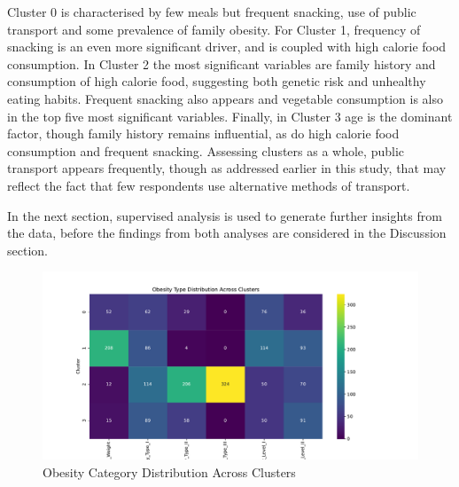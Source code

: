 Cluster 0 is characterised by few meals but frequent snacking, use of public transport and some prevalence of family obesity. For Cluster 1, frequency of snacking is an even more significant driver, and is coupled with high calorie food consumption. In Cluster 2 the most significant variables are family history and consumption of high calorie food, suggesting both genetic risk and unhealthy eating habits. Frequent snacking also appears and vegetable consumption is also in the top five most significant variables. Finally, in Cluster 3 age is the dominant factor, though family history remains influential, as do high calorie food consumption and frequent snacking. Assessing clusters as a whole, public transport appears frequently, though as addressed earlier in this study, that may reflect the fact that few respondents use alternative methods of transport.

In the next section, supervised analysis is used to generate further insights from the data, before the findings from both analyses are considered in the Discussion section. 

\begin{figure}[h]
    \centering
    \includegraphics[width=1\textwidth]{obesity_clusters.pdf}
    \caption{Obesity Category Distribution Across Clusters}
    \label{fig:obesity_clusters}
\end{figure}

